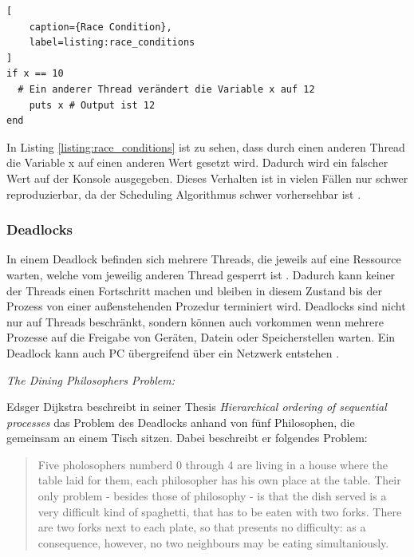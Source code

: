\begin{lstlisting}[
	caption={Race Condition},
	label=listing:race_conditions
]
if x == 10
  # Ein anderer Thread verändert die Variable x auf 12
	puts x # Output ist 12 
end
\end{lstlisting}

In Listing \ref{listing:race_conditions} ist zu sehen, dass durch einen anderen Thread die Variable x auf einen anderen Wert gesetzt wird. Dadurch wird ein falscher Wert auf der Konsole ausgegeben. Dieses Verhalten ist in vielen Fällen nur schwer reproduzierbar, da der Scheduling Algorithmus schwer vorhersehbar ist \cite[]{Net92}.

\subsubsection{Deadlocks}

In einem Deadlock befinden sich mehrere Threads, die jeweils auf eine Ressource warten, welche vom jeweilig anderen Thread gesperrt ist \cite[p. 1]{Jah04}. Dadurch kann keiner der Threads einen Fortschritt machen und bleiben in diesem Zustand bis der Prozess von einer außenstehenden Prozedur terminiert wird. Deadlocks sind nicht nur auf Threads beschränkt, sondern können auch vorkommen wenn mehrere Prozesse auf die Freigabe von Geräten, Datein oder Speicherstellen warten. Ein Deadlock kann auch PC übergreifend über ein Netzwerk entstehen \cite[p. 177]{tan09}. 

\emph{The Dining Philosophers Problem:}

Edsger Dijkstra beschreibt in seiner Thesis \emph{Hierarchical ordering of sequential processes} das Problem des Deadlocks anhand von fünf Philosophen, die gemeinsam an einem Tisch sitzen. Dabei beschreibt er folgendes Problem:

\begin{quote}
	Five pholosophers numberd 0 through 4 are living in a house where the table laid for them, each philosopher has his own place at the table. Their only problem - besides those of philosophy - is that the dish served is a very difficult kind of spaghetti, that has to be eaten with two forks. There are two forks next to each plate, so that presents no difficulty: as a consequence, however, no two neighbours may be eating simultaniously. \cite[p. 21]{dij71}
\end{quote} 

